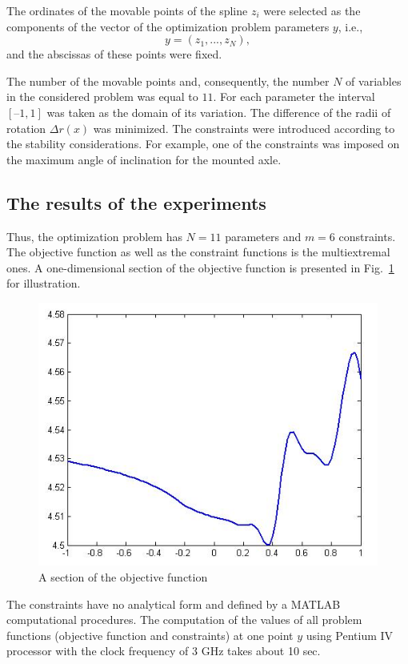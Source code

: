 The ordinates of the movable points of the spline $z_i$ were selected as the components of the vector of the optimization problem parameters $y$, i.e.,
\[
y=(z_1,...,z_N),
\]
and the abscissas of these points were fixed.

The number of the movable points and, consequently, the number $N$ of variables in the considered problem was equal to $11$. For each parameter   the interval $\left[–1, 1\right]$ was taken as the domain of its variation. The difference of the radii of rotation $\Delta r(x)$ was minimized. The constraints were introduced according to the stability considerations. For example, one of the constraints was imposed on the maximum angle of inclination for the mounted axle.

\subsection{The results of the experiments}

Thus, the optimization problem has $N=11$ parameters and $m=6$ constraints. The objective function as well as the constraint functions is the multiextremal ones. A one-dimensional section of the objective function is presented in Fig.~\ref{8_fig_4} for illustration.

\begin{figure}[t]
\includegraphics[width=0.7\linewidth]{figures/8_4.png}
\caption{A section of the objective function }
\label{8_fig_4}     
\end{figure}

The constraints have no analytical form and defined by a MATLAB computational procedures. The computation of the values of all problem functions (objective function and constraints) at one point $y$ using Pentium IV processor with the clock frequency of 3 GHz takes about 10 sec. 

